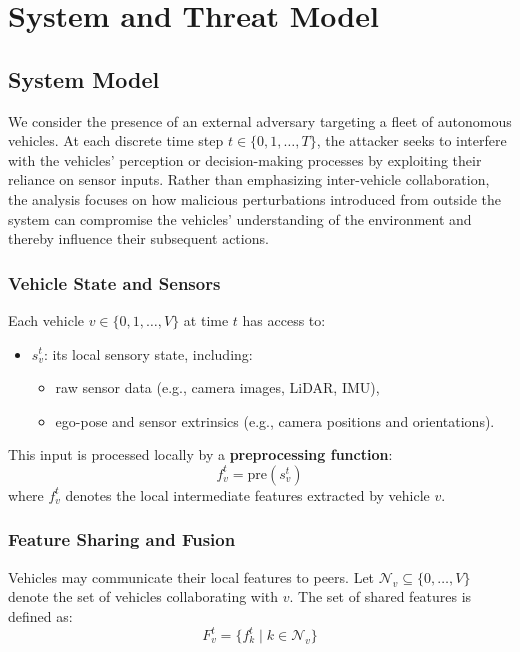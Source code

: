 \chapter{System and Threat Model}
\label{models}

\section{System Model}

We consider the presence of an external adversary targeting a fleet of autonomous vehicles.  
At each discrete time step \( t \in \{0, 1, \dots, T\} \), the attacker seeks to interfere with the vehicles’ perception or decision-making processes by exploiting their reliance on sensor inputs.  
Rather than emphasizing inter-vehicle collaboration, the analysis focuses on how malicious perturbations introduced from outside the system can compromise the vehicles’ understanding of the environment and thereby influence their subsequent actions.  

\subsection{Vehicle State and Sensors}

Each vehicle \( v \in \{0, 1, \dots, V\} \) at time \( t \) has access to:

\begin{itemize}
    \item \( s_v^t \): its local sensory state, including:
    \begin{itemize}
        \item raw sensor data (e.g., camera images, LiDAR, IMU),
        \item ego-pose and sensor extrinsics (e.g., camera positions and orientations).
    \end{itemize}
\end{itemize}

This input is processed locally by a \textbf{preprocessing function}:
\[
f_v^t = \text{pre}(s_v^t)
\]
where \( f_v^t \) denotes the local intermediate features extracted by vehicle \( v \).

\subsection{Feature Sharing and Fusion}

Vehicles may communicate their local features to peers. Let \( \mathcal{N}_v \subseteq \{0, \dots, V\} \) denote the set of vehicles collaborating with \( v \). The set of shared features is defined as:
\[
F_v^t = \{f_k^t \mid k \in \mathcal{N}_v\}
\]

